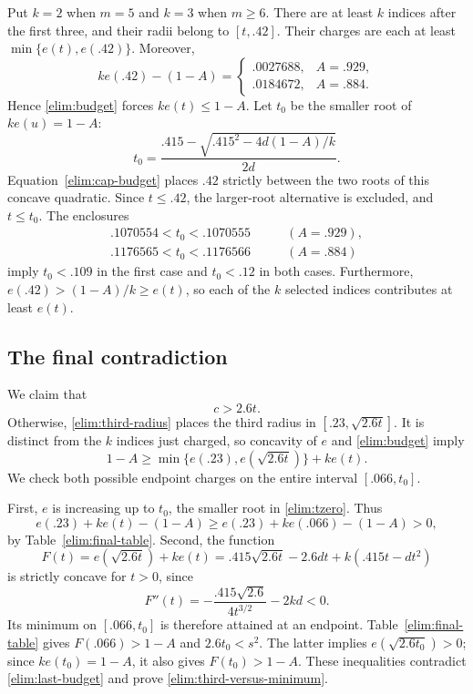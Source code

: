 Put $k=2$ when $m=5$ and $k=3$ when $m\ge6$. There are at least
$k$ indices after the first three, and their radii belong to $[t,.42]$.
Their charges are each at least $\min\{e(t),e(.42)\}$. Moreover,
\begin{equation}\label{elim:cap-budget}
 ke(.42)-(1-A)=
 \begin{cases}.0027688,&A=.929,\\.0184672,&A=.884.
 \end{cases}
\end{equation}
Hence \eqref{elim:budget} forces $ke(t)\le1-A$.
Let $t_0$ be the smaller root of $ke(u)=1-A$:
\begin{equation}\label{elim:tzero}
 t_0=\frac{.415-\sqrt{.415^2-4d(1-A)/k}}{2d}.
\end{equation}
Equation~\eqref{elim:cap-budget} places $.42$ strictly between the
two roots of this concave quadratic. Since $t\le.42$, the larger-root
alternative is excluded, and $t\le t_0$. The enclosures
\begin{equation}\label{elim:tzero-enclosures}
 \begin{aligned}
 .1070554<t_0<.1070555&\qquad(A=.929),\\
 .1176565<t_0<.1176566&\qquad(A=.884)
 \end{aligned}
\end{equation}
imply $t_0<.109$ in the first case and $t_0<.12$ in both cases.
Furthermore, $e(.42)>(1-A)/k\ge e(t)$, so each of the $k$ selected
indices contributes at least $e(t)$.

\subsection{The final contradiction}

We claim that
\begin{equation}\label{elim:third-versus-minimum}
 c>2.6t.
\end{equation}
Otherwise, \eqref{elim:third-radius} places the third radius in
$[.23,\sqrt{2.6t}]$. It is distinct from the $k$ indices just charged,
so concavity of $e$ and \eqref{elim:budget} imply
\begin{equation}\label{elim:last-budget}
 1-A\ge\min\{e(.23),e(\sqrt{2.6t})\}+ke(t).
\end{equation}
We check both possible endpoint charges on the entire interval
$[.066,t_0]$.

First, $e$ is increasing up to $t_0$, the smaller root in
\eqref{elim:tzero}. Thus
\[
 e(.23)+ke(t)-(1-A)
 \ge e(.23)+ke(.066)-(1-A)>0,
\]
by Table~\ref{elim:final-table}. Second, the function
\[
 F(t)=e(\sqrt{2.6t})+ke(t)
     =.415\sqrt{2.6t}-2.6dt+k(.415t-dt^2)
\]
is strictly concave for $t>0$, since
\[
 F''(t)=-\frac{.415\sqrt{2.6}}{4t^{3/2}}-2kd<0.
\]
Its minimum on $[.066,t_0]$ is therefore attained at an endpoint.
Table~\ref{elim:final-table} gives $F(.066)>1-A$ and $2.6t_0<s^2$.
The latter implies $e(\sqrt{2.6t_0})>0$; since $ke(t_0)=1-A$, it
also gives $F(t_0)>1-A$. These inequalities contradict
\eqref{elim:last-budget} and prove \eqref{elim:third-versus-minimum}.

